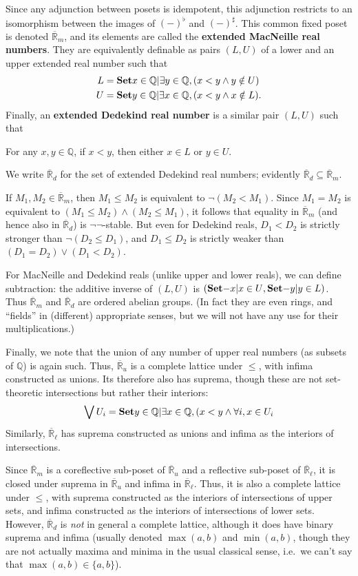 \documentclass{article}
\def\Q{\mathbb{Q}}
\def\R{\mathbb{R}}
\def\Re{\overline{\R}}
\def\Red{\Re_d}
\def\Rem{\Re_m}
\def\Reu{\Re_u}
\def\Rel{\Re_{\ell}}
\def\upp#1{{#1}^{\sharp}}
\def\low#1{{#1}^{\flat}}
\def\nn{\ensuremath{\neg\neg}}
\begin{document}
Since any adjunction between posets is idempotent, this adjunction restricts to an isomorphism between the images of $\low{(-)}$ and $\upp{(-)}$.
This common fixed poset is denoted $\Rem$, and its elements are called the \textbf{extended MacNeille real numbers}.
They are equivalently definable as pairs $(L,U)$ of a lower and an upper extended real number such that
\begin{align*}
 L &= \setof{x\in\Q | \exists y\in \Q, (x<y \land y\notin U)}\\
 U &= \setof{y\in\Q | \exists x\in \Q, (x<y \land x\notin L)}.
\end{align*}
Finally, an \textbf{extended Dedekind real number} is a similar pair $(L,U)$ such that
\begin{center}
  For any $x,y\in\Q$, if $x<y$, then either $x\in L$ or $y\in U$.
\end{center}
We write $\Red$ for the set of extended Dedekind real numbers; evidently $\Red \subseteq \Rem$.

If $M_1,M_2\in\Rem$, then $M_1 \le M_2$ is equivalent to $\neg(M_2<M_1)$.
Since $M_1=M_2$ is equivalent to $(M_1 \le M_2) \land (M_2 \le M_1)$, it follows that equality in $\Rem$ (and hence also in $\Red$) is \nn-stable.
But even for Dedekind reals, $D_1<D_2$ is strictly stronger than $\neg(D_2 \le D_1)$, and $D_1\le D_2$ is strictly weaker than $(D_1=D_2) \lor (D_1 < D_2)$.

For MacNeille and Dedekind reals (unlike upper and lower reals), we can define subtraction: the additive inverse of $(L,U)$ is $( \setof{-x | x\in U}, \setof{-y | y\in L})$.
Thus $\Rem$ and $\Red$ are ordered abelian groups.
(In fact they are even rings, and ``fields'' in (different) appropriate senses, but we will not have any use for their multiplications.)

Finally, we note that the union of any number of upper real numbers (as subsets of $\Q$) is again such.
Thus, $\Reu$ is a complete lattice under $\le$, with infima constructed as unions.
Its therefore also has suprema, though these are not set-theoretic intersections but rather their interiors:
\[ \bigvee U_i = \setof{ y\in\Q | \exists x\in\Q, (x<y \land \forall i, x\in U_i}\]
Similarly, $\Rel$ has suprema constructed as unions and infima as the interiors of intersections.

Since $\Rem$ is a coreflective sub-poset of $\Reu$ and a reflective sub-poset of $\Rel$, it is closed under suprema in $\Reu$ and infima in $\Rel$.
Thus, it is also a complete lattice under $\le$, with suprema constructed as the interiors of intersections of upper sets, and infima constructed as the interiors of intersections of lower sets.
However, $\Red$ is \emph{not} in general a complete lattice, although it does have binary suprema and infima (usually denoted $\max(a,b)$ and $\min(a,b)$, though they are not actually maxima and minima in the usual classical sense, i.e.\ we can't say that $\max(a,b) \in \{a,b\}$).
\end{document}
